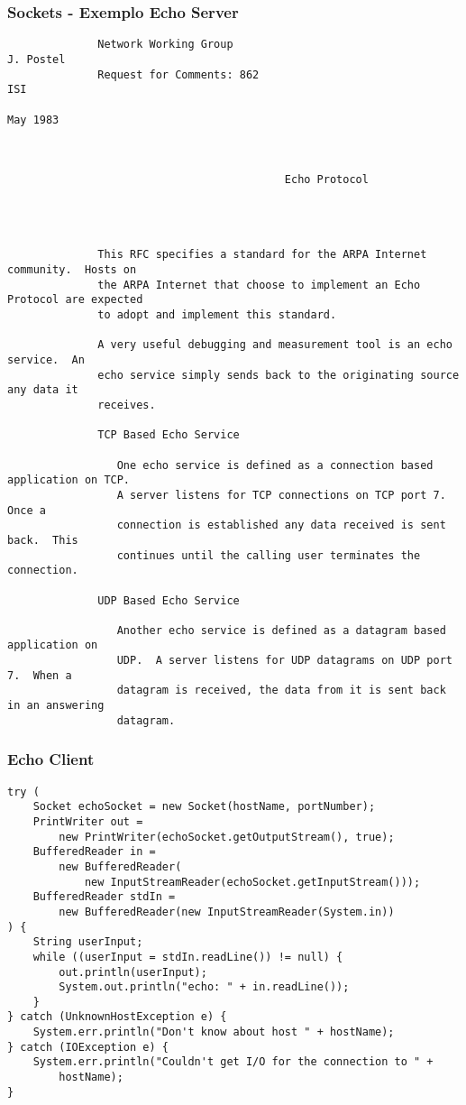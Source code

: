 \documentclass[Ligatures=TeX,table,brazil,svgnames,usetotalslideindicator,comp
ress,10pt]{beamer}
\begin{document}
\begin{frame}[fragile]
  \frametitle{Sockets - Exemplo Echo Server}
{\tiny \centering
\begin{verbatim}
              Network Working Group                                          J. Postel
              Request for Comments: 862                                            ISI
                                                                              May 1983



                                           Echo Protocol




              This RFC specifies a standard for the ARPA Internet community.  Hosts on
              the ARPA Internet that choose to implement an Echo Protocol are expected
              to adopt and implement this standard.

              A very useful debugging and measurement tool is an echo service.  An
              echo service simply sends back to the originating source any data it
              receives.

              TCP Based Echo Service

                 One echo service is defined as a connection based application on TCP.
                 A server listens for TCP connections on TCP port 7.  Once a
                 connection is established any data received is sent back.  This
                 continues until the calling user terminates the connection.

              UDP Based Echo Service

                 Another echo service is defined as a datagram based application on
                 UDP.  A server listens for UDP datagrams on UDP port 7.  When a
                 datagram is received, the data from it is sent back in an answering
                 datagram.
\end{verbatim}}

\end{frame}

\begin{frame}[fragile]
  \frametitle{Echo Client}
  \footnotesize
\begin{verbatim}
try (
    Socket echoSocket = new Socket(hostName, portNumber);
    PrintWriter out =
        new PrintWriter(echoSocket.getOutputStream(), true);
    BufferedReader in =
        new BufferedReader(
            new InputStreamReader(echoSocket.getInputStream()));
    BufferedReader stdIn =
        new BufferedReader(new InputStreamReader(System.in))
) {
    String userInput;
    while ((userInput = stdIn.readLine()) != null) {
        out.println(userInput);
        System.out.println("echo: " + in.readLine());
    }
} catch (UnknownHostException e) {
    System.err.println("Don't know about host " + hostName);
} catch (IOException e) {
    System.err.println("Couldn't get I/O for the connection to " +
        hostName);
}
\end{verbatim}
\end{frame}
\end{document}
